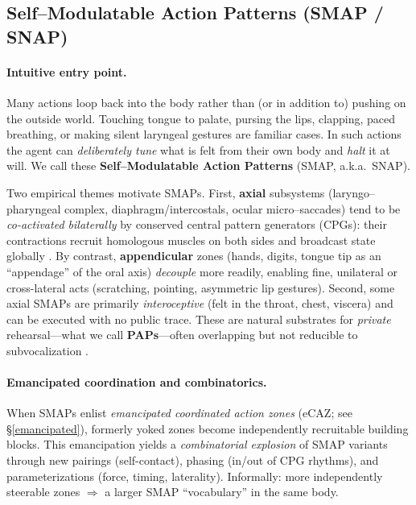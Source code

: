 \subsection{Self–Modulatable Action Patterns (SMAP / SNAP)}
\label{subsec:smap}

\paragraph{Intuitive entry point.}
Many actions loop back into the body rather than (or in addition to) pushing on the outside world. Touching tongue to palate, pursing the lips, clapping, paced breathing, or making silent laryngeal gestures are familiar cases. In such actions the agent can \emph{deliberately tune} what is felt from their own body and \emph{halt} it at will. We call these \textbf{Self–Modulatable Action Patterns} (SMAP, a.k.a.\ SNAP). 

Two empirical themes motivate SMAPs. First, \textbf{axial} subsystems (laryngo–pharyngeal complex, diaphragm/intercostals, ocular micro–saccades) tend to be \emph{co-activated bilaterally} by conserved central pattern generators (CPGs): their contractions recruit homologous muscles on both sides and broadcast state globally \citep{FeldmanDelNegro2006RespiratoryRhythm,Kelso1995DynamicPatterns}. By contrast, \textbf{appendicular} zones (hands, digits, tongue tip as an “appendage” of the oral axis) \emph{decouple} more readily, enabling fine, unilateral or cross-lateral acts (scratching, pointing, asymmetric lip gestures). Second, some axial SMAPs are primarily \emph{interoceptive} (felt in the throat, chest, viscera) and can be executed with no public trace. These are natural substrates for \emph{private} rehearsal—what we call \textbf{PAPs}—often overlapping but not reducible to subvocalization \citep{AldersonDayFernyhough2015InnerSpeech,Guenther2016NeuralControlSpeech}.

\paragraph{Emancipated coordination and combinatorics.}
When SMAPs enlist \emph{emancipated coordinated action zones} (eCAZ; see \S\ref{emancipated}), formerly yoked zones become independently recruitable building blocks. This emancipation yields a \emph{combinatorial explosion} of SMAP variants through new pairings (self-contact), phasing (in/out of CPG rhythms), and parameterizations (force, timing, laterality). Informally: more independently steerable zones $\Rightarrow$ a larger SMAP “vocabulary” in the same body.

